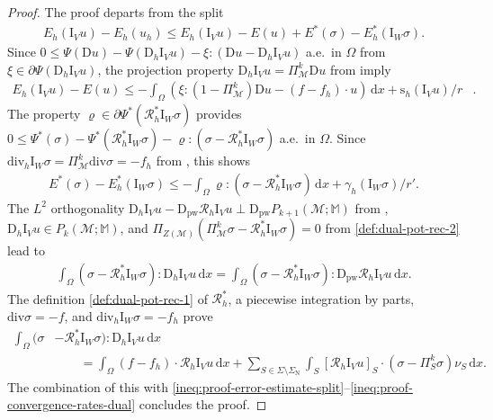 \documentclass[a4paper]{amsart}
\numberwithin{equation}{section}
\renewcommand{\d}[1]{\,\mathrm{d}#1}
\renewcommand{\div}{\mathrm{div}}
\newcommand{\I}{\mathrm{I}}
\newcommand{\Mcal}{\mathcal{M}}
\newcommand{\pw}{\mathrm{pw}}
\newcommand{\D}{\mathrm{D}}
\newcommand{\s}{\mathrm{s}}
\newcommand{\M}{\mathbb{M}}
\theoremstyle{remark}
\begin{document}
\begin{proof}
	The proof departs from the split
	\begin{align}\label{ineq:proof-error-estimate-split}
		E_h(\I_V u) - E_h(u_h) \leq E_h(\I_V u) - E(u) + E^*(\sigma) - E_h^*(\I_W \sigma).
	\end{align}
	Since $0 \leq \Psi(\D u) - \Psi(\D_h \I_V u) - \xi : (\D u - \D_h \I_V u)$ a.e.~in $\Omega$ from $\xi \in \partial \Psi(\D_h \I_V u)$, the projection property $\D_h \I_V u = \Pi_\Mcal^k \D u$ from  imply
	\begin{align}\label{ineq:proof-convergence-rates-primal}
		E_h(\I_V u) - E(u) \leq - \int_\Omega (\xi : (1 - \Pi_\Mcal^k) \D u - (f - f_h) \cdot u) \d{x} + \s_h(\I_V u)/r&.
	\end{align}
	The property $\varrho \in \partial \Psi^*(\mathcal{R}_h^* \I_W \sigma)$ provides $0 \leq \Psi^*(\sigma) - \Psi^*(\mathcal{R}^*_h \I_W \sigma) - \varrho : (\sigma - \mathcal{R}^*_h \I_W \sigma)$ a.e.~in $\Omega$. Since $\div_h \I_W \sigma = \Pi_\Mcal^k \div \sigma = -f_h$ from , this shows
	\begin{align}\label{ineq:proof-convergence-rates-dual}
		E^*(\sigma) - E^*_h(\I_W \sigma) \leq - \int_\Omega \varrho : (\sigma - \mathcal{R}_h^* \I_W \sigma) \d{x} + \gamma_h(\I_W \sigma)/r'.
	\end{align}
	The $L^2$ orthogonality
	$\D_h \I_V u - \D_\pw \mathcal{R}_h \I_V u \perp \D_\pw P_{k+1}(\Mcal;\M)$ from , $\D_h \I_V u \in P_k(\Mcal;\M)$, and $\Pi_{Z(\Mcal)}(\Pi_\Mcal^k \sigma - \mathcal{R}_h^* \I_W \sigma) = 0$ from \eqref{def:dual-pot-rec-2} lead to
	\begin{align}\label{eq:proof-error-estimate-ibp-1}
		\int_\Omega (\sigma - \mathcal{R}_h^* \I_W \sigma) : \D_h \I_V u \d{x} = \int_\Omega (\sigma - \mathcal{R}_h^* \I_W \sigma) : \D_\pw \mathcal{R}_h \I_V u \d{x}.
	\end{align}
	The definition \eqref{def:dual-pot-rec-1} of $\mathcal{R}_h^*$, a piecewise integration by parts, $\div \sigma = - f$, and $\div_h \I_W \sigma = - f_h$ prove
	\begin{align}\label{eq:proof-error-estimate-ibp-2}
		\int_\Omega (\sigma &- \mathcal{R}_h^* \I_W \sigma) : \D_h\I_V u \d{x}\nonumber\\
		&\qquad = \int_\Omega (f - f_h) \cdot \mathcal{R}_h \I_V u \d{x}
		+ \sum_{S \in \Sigma \setminus \Sigma_\mathrm{N}} \int_S [\mathcal{R}_h \I_V u]_S \cdot (\sigma - \Pi_S^k \sigma) \nu_S \d{x}.
	\end{align}
	The combination of this with \eqref{ineq:proof-error-estimate-split}--\eqref{ineq:proof-convergence-rates-dual} concludes the proof.
\end{proof}
\end{document}
